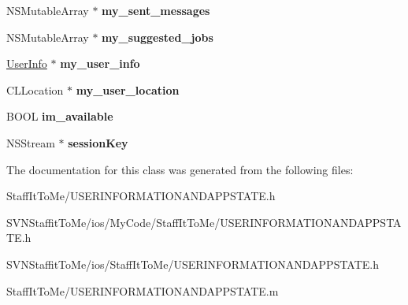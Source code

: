 \begin{DoxyCompactItemize}
\item 
\hypertarget{interface_u_s_e_r_i_n_f_o_r_m_a_t_i_o_n_a_n_d_a_p_p_s_t_a_t_e_a94b08446067ac015ccc4b65c88e73e25}{
\-N\-S\-Mutable\-Array $\ast$ {\bfseries my\-\_\-sent\-\_\-messages}}
\label{interface_u_s_e_r_i_n_f_o_r_m_a_t_i_o_n_a_n_d_a_p_p_s_t_a_t_e_a94b08446067ac015ccc4b65c88e73e25}

\item 
\hypertarget{interface_u_s_e_r_i_n_f_o_r_m_a_t_i_o_n_a_n_d_a_p_p_s_t_a_t_e_abdc513adf8b56c9c00af9773739059d6}{
\-N\-S\-Mutable\-Array $\ast$ {\bfseries my\-\_\-suggested\-\_\-jobs}}
\label{interface_u_s_e_r_i_n_f_o_r_m_a_t_i_o_n_a_n_d_a_p_p_s_t_a_t_e_abdc513adf8b56c9c00af9773739059d6}

\item 
\hypertarget{interface_u_s_e_r_i_n_f_o_r_m_a_t_i_o_n_a_n_d_a_p_p_s_t_a_t_e_ac38eb55231092b940c163570da0b071d}{
\hyperlink{interface_user_info}{\-User\-Info} $\ast$ {\bfseries my\-\_\-user\-\_\-info}}
\label{interface_u_s_e_r_i_n_f_o_r_m_a_t_i_o_n_a_n_d_a_p_p_s_t_a_t_e_ac38eb55231092b940c163570da0b071d}

\item 
\hypertarget{interface_u_s_e_r_i_n_f_o_r_m_a_t_i_o_n_a_n_d_a_p_p_s_t_a_t_e_ac9e93171b7098ec6b19fa593391c38dc}{
\-C\-L\-Location $\ast$ {\bfseries my\-\_\-user\-\_\-location}}
\label{interface_u_s_e_r_i_n_f_o_r_m_a_t_i_o_n_a_n_d_a_p_p_s_t_a_t_e_ac9e93171b7098ec6b19fa593391c38dc}

\item 
\hypertarget{interface_u_s_e_r_i_n_f_o_r_m_a_t_i_o_n_a_n_d_a_p_p_s_t_a_t_e_ab6bb25a8c0facb8f4d6a253286d1d094}{
\-B\-O\-O\-L {\bfseries im\-\_\-available}}
\label{interface_u_s_e_r_i_n_f_o_r_m_a_t_i_o_n_a_n_d_a_p_p_s_t_a_t_e_ab6bb25a8c0facb8f4d6a253286d1d094}

\item 
\hypertarget{interface_u_s_e_r_i_n_f_o_r_m_a_t_i_o_n_a_n_d_a_p_p_s_t_a_t_e_a7f2e2d4750374acf1188a685bdb31830}{
\-N\-S\-Stream $\ast$ {\bfseries session\-Key}}
\label{interface_u_s_e_r_i_n_f_o_r_m_a_t_i_o_n_a_n_d_a_p_p_s_t_a_t_e_a7f2e2d4750374acf1188a685bdb31830}

\end{DoxyCompactItemize}


\-The documentation for this class was generated from the following files\-:\begin{DoxyCompactItemize}
\item 
\-Staff\-It\-To\-Me/\-U\-S\-E\-R\-I\-N\-F\-O\-R\-M\-A\-T\-I\-O\-N\-A\-N\-D\-A\-P\-P\-S\-T\-A\-T\-E.\-h\item 
\-S\-V\-N\-Staffit\-To\-Me/ios/\-My\-Code/\-Staff\-It\-To\-Me/\-U\-S\-E\-R\-I\-N\-F\-O\-R\-M\-A\-T\-I\-O\-N\-A\-N\-D\-A\-P\-P\-S\-T\-A\-T\-E.\-h\item 
\-S\-V\-N\-Staffit\-To\-Me/ios/\-Staff\-It\-To\-Me/\-U\-S\-E\-R\-I\-N\-F\-O\-R\-M\-A\-T\-I\-O\-N\-A\-N\-D\-A\-P\-P\-S\-T\-A\-T\-E.\-h\item 
\-Staff\-It\-To\-Me/\-U\-S\-E\-R\-I\-N\-F\-O\-R\-M\-A\-T\-I\-O\-N\-A\-N\-D\-A\-P\-P\-S\-T\-A\-T\-E.\-m\end{DoxyCompactItemize}
